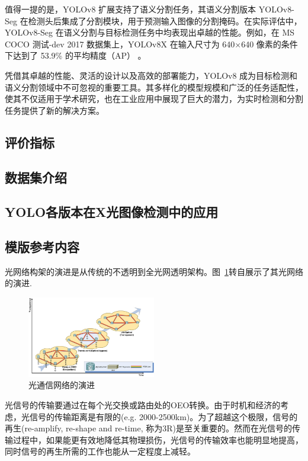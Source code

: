 \documentclass[11pt,twocolumn]{ctexart}
\begin{document}
值得一提的是，YOLOv8 扩展支持了语义分割任务，其语义分割版本 YOLOv8-Seg 在检测头后集成了分割模块，用于预测输入图像的分割掩码。在实际评估中，YOLOv8-Seg 在语义分割与目标检测任务中均表现出卓越的性能。例如，在 MS COCO 测试-dev 2017 数据集上，YOLOv8X 在输入尺寸为 640×640 像素的条件下达到了 53.9\% 的平均精度（AP） 。

凭借其卓越的性能、灵活的设计以及高效的部署能力，YOLOv8 成为目标检测和语义分割领域中不可忽视的重要工具。其多样化的模型规模和广泛的任务适配性，使其不仅适用于学术研究，也在工业应用中展现了巨大的潜力，为实时检测和分割任务提供了新的解决方案。



\subsection{评价指标}
\subsection{数据集介绍}
\subsection{YOLO各版本在X光图像检测中的应用}

\subsection{模版参考内容}
光网络构架的演进是从传统的不透明到全光网透明架构。图~\ref{EVO}转自\cite{1}展示了其光网络的演进.
\begin{figure}[!hbtp]
  \begin{center}
  \includegraphics[width=0.5\textwidth]{EVO}
  \end{center}
  \caption{光通信网络的演进}
  \label{EVO}
\end{figure}

光信号的传输要通过在每个光交换或路由处的OEO转换。由于时机和经济的考虑，光信号的传输距离是有限的(e.g. 2000-2500km)。为了超越这个极限，信号的再生(re-amplify, re-shape and re-time, 称为3R)是至关重要的。然而在光信号的传输过程中，如果能更有效地降低其物理损伤，光信号的传输效率也能明显地提高，同时信号的再生所需的工作也能从一定程度上减轻。
\end{document}
